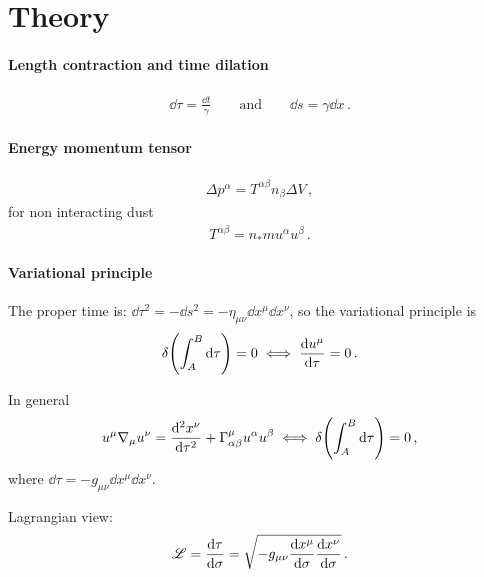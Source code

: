 \documentclass[main.tex]{subfiles}
\begin{document}
\section{Theory}

\paragraph{Length contraction and time dilation}

\begin{align}
\dd{\tau } = \frac{ \dd{t}}{\gamma } 
\qquad \text{and} \qquad
\dd{s} = \gamma \dd{x}
\,.
\end{align}



\paragraph{Energy momentum tensor}

\begin{align}
\Delta p^{\alpha } = T^{\alpha \beta } n_{\beta } \Delta V
\,,
\end{align}
%
for non interacting dust 
%
\begin{align}
T^{\alpha \beta } = n_{*} m u^{\alpha } u^{\beta }
\,.
\end{align}


\paragraph{Variational principle}

The proper time is:
\(\dd{\tau }^2 = - \dd{s^2} = -\eta_{\mu \nu } \dd{x^{\mu}} \dd{x^{\nu }} \), so the variational principle is 
%
\begin{align}
\delta \qty(\int_{A}^{B} \dd{\tau }) = 0 
\iff 
\dv{ u^{\mu}}{\tau} = 0
\,.
\end{align}

In general 
%
\begin{align}
u^{\mu } \nabla_{\mu } u^{\nu } = \dv[2]{x^{\nu }}{\tau } 
+ \Gamma^{\mu }_{\alpha \beta } u^{\alpha} u^{\beta }
\iff 
\delta \qty(\int_{A}^{B} \dd{\tau }) = 0
\,,
\end{align}
%
where \(\dd{\tau } = - g_{\mu \nu } \dd{x^{\mu }} \dd{x^{\nu }}\).

Lagrangian view: 
%
\begin{align}
\mathscr{L} = \dv{\tau }{\sigma }= \sqrt{- g_{\mu \nu } \dv{x^{\mu }}{\sigma } \dv{x^{\nu }}{\sigma }}
\,.
\end{align}
\end{document}
